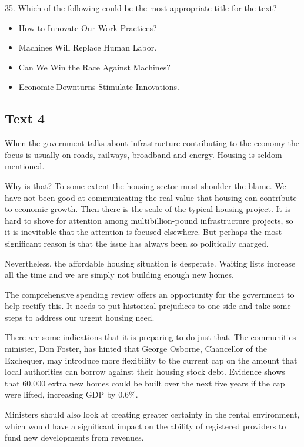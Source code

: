 \documentclass[UTF8,11pt]{ctexart}
\begin{document}
35. Which of the following could be the most appropriate title for the text?


\begin{itemize}[leftmargin=2em,itemsep=.2em,topsep=.4em]\item[A.] How to Innovate Our Work Practices?
\item[B.] Machines Will Replace Human Labor.
\item[C.] Can We Win the Race Against Machines?
\item[D.] Economic Downturns Stimulate Innovations.
\end{itemize}

\subsection*{\textbf{Text 4}}


When the government talks about infrastructure contributing to the economy the focus is usually on roads, railways, broadband and energy. Housing is seldom mentioned.


Why is that? To some extent the housing sector must shoulder the blame. We have not been good at communicating the real value that housing can contribute to economic growth. Then there is the scale of the typical housing project. It is hard to shove for attention among multibillion-pound infrastructure projects, so it is inevitable that the attention is focused elsewhere. But perhaps the most significant reason is that the issue has always been so politically charged.


Nevertheless, the affordable housing situation is desperate. Waiting lists increase all the time and we are simply not building enough new homes.


The comprehensive spending review offers an opportunity for the government to help rectify this. It needs to put historical prejudices to one side and take some steps to address our urgent housing need.


There are some indications that it is preparing to do just that. The communities minister, Don Foster, has hinted that George Osborne, Chancellor of the Exchequer, may introduce more flexibility to the current cap on the amount that local authorities can borrow against their housing stock debt. Evidence shows that 60,000 extra new homes could be built over the next five years if the cap were lifted, increasing GDP by 0.6\%.


Ministers should also look at creating greater certainty in the rental environment, which would have a significant impact on the ability of registered providers to fund new developments from revenues.
\end{document}
